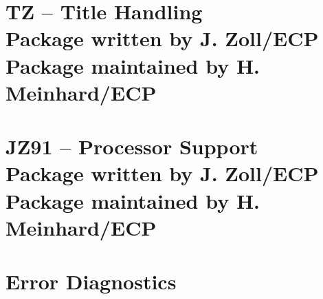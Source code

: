 \documentclass[11pt,dvips]{cernman}
\begin{document}
\part[TZ -- Title Handling]%
     {TZ -- Title Handling\\[5cm]%
      {\LARGE Package written by J. Zoll/ECP}\\[1cm]
      {\LARGE Package maintained by H. Meinhard/ECP}}

\part[JZ91 -- Processor support]%
     {JZ91 -- Processor Support\\[5cm]%
      {\LARGE Package written by J. Zoll/ECP}\\[1cm]
      {\LARGE Package maintained by H. Meinhard/ECP}}

\part{Error Diagnostics}

\appendix




\printindex
\end{document}
